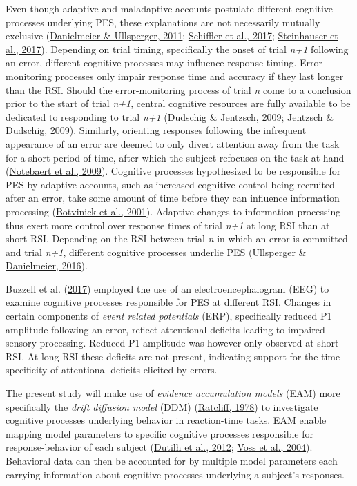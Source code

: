 \documentclass[
  man,floatsintext]{apa7}
\begin{document}
Even though adaptive and maladaptive accounts postulate different cognitive processes underlying PES, these explanations are not necessarily mutually exclusive (\protect\hyperlink{ref-danielmeier2011}{Danielmeier \& Ullsperger, 2011}; \protect\hyperlink{ref-schiffler2017}{Schiffler et al., 2017}; \protect\hyperlink{ref-steinhauser2017}{Steinhauser et al., 2017}). Depending on trial timing, specifically the onset of trial \emph{n+1} following an error, different cognitive processes may influence response timing. Error-monitoring processes only impair response time and accuracy if they last longer than the RSI. Should the error-monitoring process of trial \emph{n} come to a conclusion prior to the start of trial \emph{n+1}, central cognitive resources are fully available to be dedicated to responding to trial \emph{n+1} (\protect\hyperlink{ref-dudschig2009}{Dudschig \& Jentzsch, 2009}; \protect\hyperlink{ref-jentzsch2009}{Jentzsch \& Dudschig, 2009}). Similarly, orienting responses following the infrequent appearance of an error are deemed to only divert attention away from the task for a short period of time, after which the subject refocuses on the task at hand (\protect\hyperlink{ref-notebaert2009}{Notebaert et al., 2009}). Cognitive processes hypothesized to be responsible for PES by adaptive accounts, such as increased cognitive control being recruited after an error, take some amount of time before they can influence information processing (\protect\hyperlink{ref-botvinick2001}{Botvinick et al., 2001}). Adaptive changes to information processing thus exert more control over response times of trial \emph{n+1} at long RSI than at short RSI. Depending on the RSI between trial \emph{n} in which an error is committed and trial \emph{n+1}, different cognitive processes underlie PES (\protect\hyperlink{ref-ullsperger2016}{Ullsperger \& Danielmeier, 2016}).

Buzzell et al. (\protect\hyperlink{ref-buzzel2017}{2017}) employed the use of an electroencephalogram (EEG) to examine cognitive processes responsible for PES at different RSI. Changes in certain components of \emph{event related potentials} (ERP), specifically reduced P1 amplitude following an error, reflect attentional deficits leading to impaired sensory processing. Reduced P1 amplitude was however only observed at short RSI. At long RSI these deficits are not present, indicating support for the time-specificity of attentional deficits elicited by errors.

The present study will make use of \emph{evidence accumulation models} (EAM) more specifically the \emph{drift diffusion model} (DDM) (\protect\hyperlink{ref-ratcliff1978}{Ratcliff, 1978}) to investigate cognitive processes underlying behavior in reaction-time tasks. EAM enable mapping model parameters to specific cognitive processes responsible for response-behavior of each subject (\protect\hyperlink{ref-dutilh2012testing}{Dutilh et al., 2012}; \protect\hyperlink{ref-voss2004}{Voss et al., 2004}).
Behavioral data can then be accounted for by multiple model parameters each carrying information about cognitive processes underlying a subject's responses.
\end{document}

